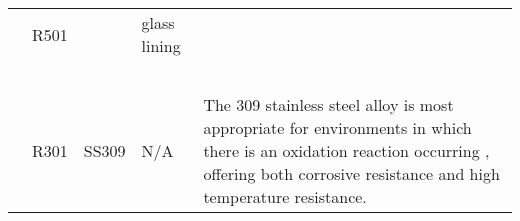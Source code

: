 {\begin{tabular}{@{}lp{5cm}p{2cm}p{2cm}p{12cm}@{}}
                                                      & R501                                                   &                                                                                        & glass lining                                      &                                                                                                                                                                                                                                                                                                                                                                                                                                                                                                                                                                                                                                                                                                                                                                                                                                                                                                                    \\ \\ \\ \\ \\ \\ \cmidrule(l){2-5}
                                                      & R301                                                   & \multirow[t]{2}{=}{SS309}                                                                 & \multirow[t]{2}{=}{N/A}                              & \multirow[t]{2}{=}{The 309 stainless steel alloy is most appropriate for environments in which there is an oxidation reaction occurring \cite{sinnott_coulson_2005}, offering both corrosive resistance and high temperature resistance.}                                                                                                                                                                                                                                                                                                                                                                                                                                                                                                                                                                                                                                                                                                          \\ \cmidrule(l){2-2}

\end{tabular}}
